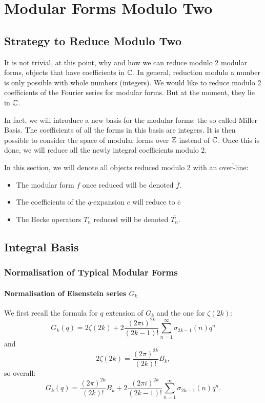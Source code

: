 \section{Modular Forms Modulo Two}
\subsection{Strategy to Reduce Modulo Two}
It is not trivial, at this point, why and how we can reduce modulo 2 modular forms, objects that have coefficients in $\mathbb{C}$.
In general, reduction modulo a number is only possible with whole numbers (integers).
We would like to reduce modulo 2 coefficients of the Fourier series for modular forms.
But at the moment, they lie in $\mathbb{C}$.

In fact, we will introduce a new basis for the modular forms: the so called Miller Basis.
The coefficients of all the forms in this basis are integers. It is then possible to consider the space of modular forms over $\mathbb{Z}$ instead of $\mathbb{C}$.
Once this is done, we will reduce all the newly integral coefficients modulo $2$.

In this section, we will denote all objects reduced modulo 2 with an $\overline{\text{over-line}}$:
\begin{itemize}
	\item The modular form $f$ once reduced will be denoted $\overline{f}$.	\item The coefficients of the $q$-expansion $c$ will reduce to $\overline{c}$
	\item The Hecke operators $T_n$ reduced will be denoted $\overline{T_n}$.
\end{itemize}

\subsection{Integral Basis}
\subsubsection{Normalisation of Typical Modular Forms}
\paragraph{Normalisation of Eisenstein series $G_k$}
We first recall the formula for $q$ extension of $G_k$ and the one for $\zeta(2k)$:
$$
G_k(q) = 2\zeta(2k) + 2 \frac{{(2 \pi i)}^{2k}}{(2k-1)!} \sum_{n=1}^{\infty} \sigma_{2k-1}(n)q^n
$$
and
$$
2\zeta(2k) = \frac{(2\pi)^{2k}}{(2k)!}B_k,
$$
so overall:
$$
G_k(q) = \frac{(2\pi)^{2k}}{(2k)!}B_k + 2 \frac{{(2 \pi i)}^{2k}}{(2k-1)!} \sum_{n=1}^{\infty} \sigma_{2k-1}(n)q^n.
$$

